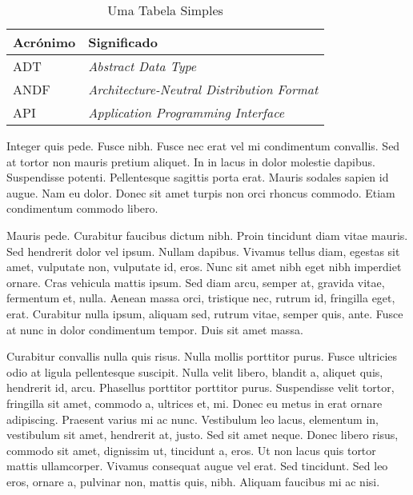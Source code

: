 \begin{table}[t]
  \centering
  \caption{Uma Tabela Simples}
\begin{tabular}{| l | p{45mm} |}
	\hline
\textbf{Acrónimo} & \textbf{Significado}\\
	\hline
	\hline
        ADT   & \emph{Abstract Data Type}\\\hline
        ANDF  & \emph{Architecture-Neutral Distribution Format}\\\hline
        API   & \emph{Application Programming Interface}\\
	\hline
\end{tabular}
  \label{tab:exemplo1}
\end{table}

Integer quis pede. Fusce nibh. Fusce nec erat vel mi condimentum
convallis. Sed at tortor non mauris pretium aliquet. In in lacus in
dolor molestie dapibus. Suspendisse potenti. Pellentesque sagittis
porta erat. Mauris sodales sapien id augue. Nam eu dolor. Donec sit
amet turpis non orci rhoncus commodo. Etiam condimentum commodo
libero.

Mauris pede. Curabitur faucibus dictum nibh. Proin tincidunt diam
vitae mauris. Sed hendrerit dolor vel ipsum. Nullam dapibus. Vivamus
tellus diam, egestas sit amet, vulputate non, vulputate id, eros. Nunc
sit amet nibh eget nibh imperdiet ornare. Cras vehicula mattis
ipsum. Sed diam arcu, semper at, gravida vitae, fermentum et,
nulla. Aenean massa orci, tristique nec, rutrum id, fringilla eget,
erat. Curabitur nulla ipsum, aliquam sed, rutrum vitae, semper quis,
ante. Fusce at nunc in dolor condimentum tempor. Duis sit amet massa.

Curabitur convallis nulla quis risus. Nulla mollis porttitor
purus. Fusce ultricies odio at ligula pellentesque suscipit. Nulla
velit libero, blandit a, aliquet quis, hendrerit id, arcu. Phasellus
porttitor porttitor purus. Suspendisse velit tortor, fringilla sit
amet, commodo a, ultrices et, mi. Donec eu metus in erat ornare
adipiscing. Praesent varius mi ac nunc. Vestibulum leo lacus,
elementum in, vestibulum sit amet, hendrerit at, justo. Sed sit amet
neque. Donec libero risus, commodo sit amet, dignissim ut, tincidunt
a, eros. Ut non lacus quis tortor mattis ullamcorper. Vivamus
consequat augue vel erat. Sed tincidunt. Sed leo eros, ornare a,
pulvinar non, mattis quis, nibh. Aliquam faucibus mi ac nisi.

